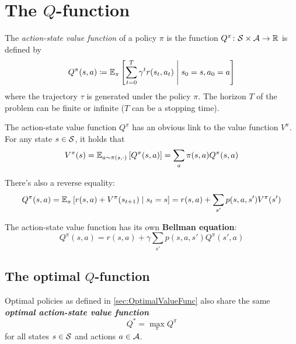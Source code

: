 \documentclass[../course-notes.tex]{subfiles}
\begin{document}
\section{The $Q$-function}



\begin{defn}
	The \textit{action-state value function} of a policy $\pi$ is the function $Q^\pi\colon \mathcal{S}\times\mathcal{A}\to \mathbb{R}$ is defined by
	\begin{equation}
	Q^\pi(s, a) \coloneqq \operatorname{\mathbb{E}}_{\pi}
	\left[
	\sum_{t=0}^T \gamma^t r(s_t, a_t) \;\middle|\; s_0 = s, a_0 = a
	\right]
	\end{equation}
	where the trajectory $\tau$ is generated under the policy $\pi$.
	The horizon $T$ of the problem can be finite or infinite ($T$ can be a stopping time).
\end{defn}



The action-state value function $Q^\pi$ has an obvious link to the value function $V^\pi$.
For any state $s\in\mathcal{S}$, it holds that
\begin{equation}\label{eq:ValueFunctionExpectationLink}
	V^\pi(s) = \operatorname{\mathbb{E}}_{a\sim \pi(s,\cdot)}\left[
	Q^\pi(s, a)
	\right]
	= \sum_a \pi(s,a) Q^\pi(s,a)
\end{equation}

There's also a reverse equality:
\begin{equation}
	Q^\pi(s,a) =
	\operatorname{\mathbb{E}}_{\pi}\left[
		r(s,a) + V^\pi(s_{t+1})
		\;\middle|\; s_t = s
	\right]
	=
	r(s, a) + \sum_{s'} p(s,a,s') V^\pi(s')
\end{equation}

The action-state value function has its own \textbf{\bluefont Bellman equation}:
\begin{equation}
	Q^\pi(s,a) = r(s,a) + \gamma
	\sum_{s'} p(s,a,s') Q^\pi(s',a)
\end{equation}


\subsection{The optimal $Q$-function}

\begin{defn}
	Optimal policies as defined in \cref{sec:OptimalValueFunc} also share the same \emph{\bfseries\bluefont optimal action-state value function}
	\begin{equation}
		Q^* = \max_\pi Q^\pi
	\end{equation}
	for all states $s\in\mathcal{S}$ and actions $a\in\mathcal{A}$.	
\end{defn}
\end{document}
